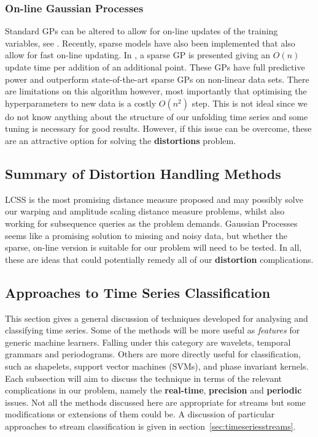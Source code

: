 	\subsubsection{On-line Gaussian Processes}
	Standard GPs can be altered to allow for on-line updates of the training variables, see \citep{osborne2007gaussian}. Recently, sparse models have also been implemented that also allow for fast on-line updating. In \citep{ranganathan2011online}, a sparse GP is presented giving an $O(n)$ update time per addition of an additional point. These GPs have full predictive power and outperform state-of-the-art sparse GPs on non-linear data sets. There are limitations on this algorithm however, most importantly that optimising the hyperparameters to new data is a costly $O(n^{2})$ step. This is not ideal since we do not know anything about the structure of our unfolding time series and some tuning is necessary for good results. However, if this issue can be overcome, these are an attractive option for solving the \textbf{distortions} problem.

	\subsection{Summary of Distortion Handling Methods}
	LCSS is the most promising distance measure proposed and may possibly solve our warping and amplitude scaling distance measure problems, whilst also working for subsequence queries as the problem demands. Gaussian Processes seems like a promising solution to missing and noisy data, but whether the sparse, on-line version is suitable for our problem will need to be tested. In all, these are ideas that could potentially remedy all of our \textbf{distortion} complications.
	
	\subsection{Approaches to Time Series Classification}
	This section gives a general discussion of techniques developed for analysing and classifying time series. Some of the methods will be more useful as \emph{features} for generic machine learners. Falling under this category are wavelets, temporal grammars and periodograms. Others are more directly useful for classification, such as shapelets, support vector machines (SVMs), and phase invariant kernels. Each subsection will aim to discuss the technique in terms of the relevant complications in our problem, namely the \textbf{real-time}, \textbf{precision} and \textbf{periodic} issues. Not all the methods discussed here are appropriate for streams but some modifications or extensions of them could be. A discussion of particular approaches to stream classification is given in section~\ref{sec:timeseriesstreams}.
	
